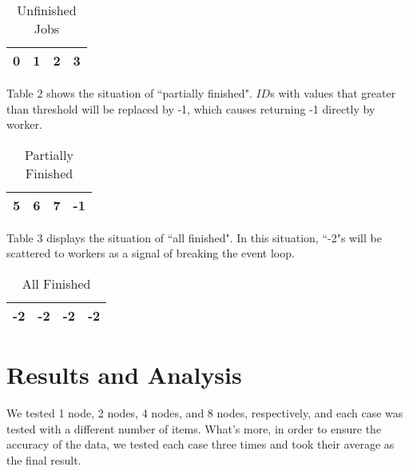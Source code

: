 \documentclass[12pt, a4paper, twocolumn]{article}
\begin{document}
    \begin{table}[h]
        \centering
        \caption{Unfinished Jobs}
        \begin{tabular}{|c|c|c|c|}
            \hline
            0 & 1 & 2 & 3\\
            \hline
        \end{tabular}
    \end{table}

    Table 2 shows the situation of ``partially finished". $ID$s with values that greater than threshold will be replaced by -1, which causes returning -1 directly by worker.

    \begin{table}[h]
        \centering
        \caption{Partially Finished}
        \begin{tabular}{|c|c|c|c|}
            \hline
            5 & 6 & 7 & -1\\
            \hline
        \end{tabular}
    \end{table}

    Table 3 displays the situation of ``all finished". In this situation, ``-2"s will be scattered to workers as a signal of breaking the event loop.

    \begin{table}[h]
        \centering
        \caption{All Finished}
        \small
        \begin{tabular}{|c|c|c|c|}
            \hline
            -2 & -2 & -2 & -2\\
            \hline
        \end{tabular}
    \end{table}

    \section{Results and Analysis}

    We tested 1 node, 2 nodes, 4 nodes, and 8 nodes, respectively, and each case was tested with a different number of items. What's more, in order to ensure the accuracy of the data, we tested each case three times and took their average as the final result.

    \begin{table}[h]
        \centering
    \end{table}
\end{document}
